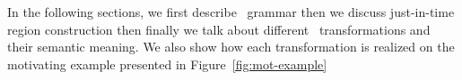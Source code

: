 In the following sections, we first describe \tool\ grammar then we discuss just-in-time region construction then finally we talk about different \toolshort\ transformations and their semantic meaning. We also show how each transformation is realized on the motivating example presented in Figure~\ref{fig:mot-example}
%
%
%
%

